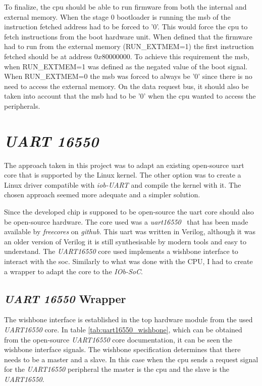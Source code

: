 To finalize, the \acrshort{cpu} should be able to run firmware from both the internal and external memory. When the stage 0 bootloader is running the \acrfull{msb} of the instruction fetched address had to be forced to '0'. This would force the \acrshort{cpu} to fetch instructions from the boot hardware unit. When defined that the firmware had to run from the external memory (RUN\_EXTMEM=1) the first instruction fetched should be at address $0x80000000$. To achieve this requirement the \acrfull{msb}, when RUN\_EXTMEM=1 was defined as the negated value of the boot signal. When RUN\_EXTMEM=0 the \acrshort{msb} was forced to always be '0' since there is no need to access the external memory. On the data request bus, it should also be taken into account that the \acrshort{msb} had to be '0' when the \acrshort{cpu} wanted to access the peripherals.

\section{\textit{UART 16550}}
\label{section:uart}
The approach taken in this project was to adapt an existing open-source \acrfull{uart} core that is supported by the Linux kernel. The other option was to create a Linux driver compatible with \textit{iob-UART} and compile the kernel with it. The chosen approach seemed more adequate and a simpler solution.

Since the developed chip is supposed to be open-source the \acrshort{uart} core should also be open-source hardware. The core used was a \textit{\acrshort{uart}16550}~\cite{gorban2002uart} that has been made available by \textit{freecores} on \textit{github}. This \acrshort{uart} was written in Verilog, although it was an older version of Verilog it is still synthesisable by modern tools and easy to understand. The \textit{UART16550} core used implements a wishbone interface to interact with the \acrfull{soc}. Similarly to what was done with the CPU, I had to create a wrapper to adapt the core to the \textit{IOb-SoC}.

\subsection{\textit{UART 16550} Wrapper}
The wishbone interface is established in the top hardware module from the used \textit{UART16550} core. In table \ref{tab:uart16550_wishbone}, which can be obtained from the open-source \textit{UART16550} core documentation, it can be seen the wishbone interface signals. The wishbone specification determines that there needs to be a master and a slave. In this case when the \acrshort{cpu} sends a request signal for the \textit{UART16550} peripheral the master is the \acrshort{cpu} and the slave is the \textit{UART16550}.


